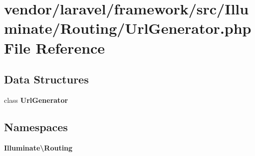 \section{vendor/laravel/framework/src/\+Illuminate/\+Routing/\+Url\+Generator.php File Reference}
\label{laravel_2framework_2src_2_illuminate_2_routing_2_url_generator_8php}
\subsection*{Data Structures}
\begin{DoxyCompactItemize}
\item 
class {\bf Url\+Generator}
\end{DoxyCompactItemize}
\subsection*{Namespaces}
\begin{DoxyCompactItemize}
\item 
 {\bf Illuminate\textbackslash{}\+Routing}
\end{DoxyCompactItemize}
